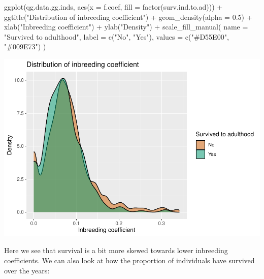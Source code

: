 \documentclass[
]{article}
\newenvironment{Shaded}{\begin{snugshade}}{\end{snugshade}}
\newcommand{\AttributeTok}[1]{\textcolor[rgb]{0.77,0.63,0.00}{#1}}
\newcommand{\FloatTok}[1]{\textcolor[rgb]{0.00,0.00,0.81}{#1}}
\newcommand{\FunctionTok}[1]{\textcolor[rgb]{0.00,0.00,0.00}{#1}}
\newcommand{\NormalTok}[1]{#1}
\newcommand{\SpecialCharTok}[1]{\textcolor[rgb]{0.00,0.00,0.00}{#1}}
\newcommand{\StringTok}[1]{\textcolor[rgb]{0.31,0.60,0.02}{#1}}
\begin{document}
\begin{Shaded}
\begin{Highlighting}[]
\FunctionTok{ggplot}\NormalTok{(qg.data.gg.inds, }\FunctionTok{aes}\NormalTok{(}\AttributeTok{x =}\NormalTok{ f.coef, }\AttributeTok{fill =} \FunctionTok{factor}\NormalTok{(surv.ind.to.ad))) }\SpecialCharTok{+}
  \FunctionTok{ggtitle}\NormalTok{(}\StringTok{"Distribution of inbreeding coefficient"}\NormalTok{) }\SpecialCharTok{+}
  \FunctionTok{geom\_density}\NormalTok{(}\AttributeTok{alpha =} \FloatTok{0.5}\NormalTok{) }\SpecialCharTok{+}
  \FunctionTok{xlab}\NormalTok{(}\StringTok{"Inbreeding coefficient"}\NormalTok{) }\SpecialCharTok{+}
  \FunctionTok{ylab}\NormalTok{(}\StringTok{"Density"}\NormalTok{) }\SpecialCharTok{+}
  \FunctionTok{scale\_fill\_manual}\NormalTok{(}
    \AttributeTok{name =} \StringTok{"Survived to adulthood"}\NormalTok{,}
    \AttributeTok{label =} \FunctionTok{c}\NormalTok{(}\StringTok{"No"}\NormalTok{, }\StringTok{"Yes"}\NormalTok{),}
    \AttributeTok{values =} \FunctionTok{c}\NormalTok{(}\StringTok{"\#D55E00"}\NormalTok{, }\StringTok{"\#009E73"}\NormalTok{)}
\NormalTok{  )}
\end{Highlighting}
\end{Shaded}

\includegraphics{EDA_files/figure-latex/unnamed-chunk-8-1.pdf}

Here we see that survival is a bit more skewed towards lower inbreeding
coefficients. We can also look at how the proportion of individuals have
survived over the years:
\end{document}
